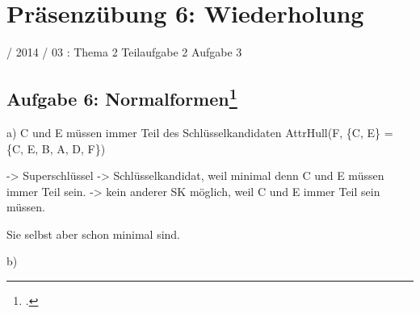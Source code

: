 \documentclass{lehramt-informatik}
\begin{document}
\chapter{Präsenzübung 6: Wiederholung}

 / 2014 / 03 : Thema 2 Teilaufgabe 2 Aufgabe 3

\section{Aufgabe 6: Normalformen\footcite{db:pu:wh}}

a) C und E müssen immer Teil des Schlüsselkandidaten
AttrHull(F, \{C, E\} = \{C, E, B, A, D, F\})

-> Superschlüssel
-> Schlüsselkandidat, weil minimal denn C und E müssen immer Teil sein.
-> kein anderer SK möglich, weil C und E immer Teil sein müssen.

Sie selbst aber schon minimal sind.

b)

\literatur
\end{document}
